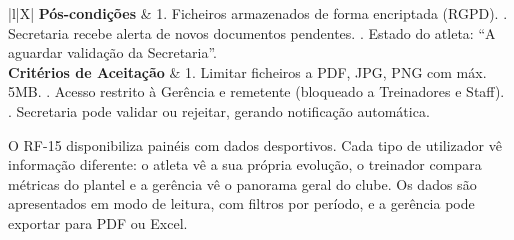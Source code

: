 {\begin{xltabular}{\textwidth}{|l|X|}
\textbf{Pós-condições} & 1. Ficheiros armazenados de forma encriptada (RGPD). . Secretaria recebe alerta de novos documentos pendentes. . Estado do atleta: ``A aguardar validação da Secretaria''. \\ \hline
\textbf{Critérios de Aceitação} & 1. Limitar ficheiros a PDF, JPG, PNG com máx. 5MB. . Acesso restrito à Gerência e remetente (bloqueado a Treinadores e Staff). . Secretaria pode validar ou rejeitar, gerando notificação automática. \\
\end{xltabular}
}


O RF-15 disponibiliza painéis com dados desportivos. Cada tipo de utilizador vê informação diferente: o atleta vê a sua própria evolução, o treinador compara métricas do plantel e a gerência vê o panorama geral do clube. Os dados são apresentados em modo de leitura, com filtros por período, e a gerência pode exportar para PDF ou Excel.

